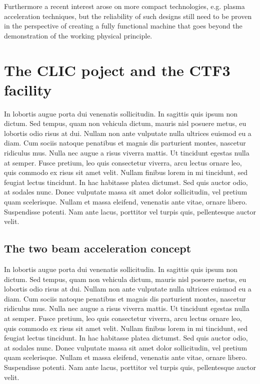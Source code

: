 Furthermore a recent interest arose on more compact technologies, e.g. plasma acceleration techniques, but the reliability of such designs still need to be proven in the perspective of creating a fully functional machine that goes beyond the demonstration of the working physical principle.

\newpage
\section{The CLIC poject and the CTF3 facility}

In lobortis augue porta dui venenatis sollicitudin. In sagittis quis ipsum non dictum. Sed tempus, quam non vehicula dictum, mauris nisl posuere metus, eu lobortis odio risus at dui. Nullam non ante vulputate nulla ultrices euismod eu a diam. Cum sociis natoque penatibus et magnis dis parturient montes, nascetur ridiculus mus. Nulla nec augue a risus viverra mattis. Ut tincidunt egestas nulla at semper. Fusce pretium, leo quis consectetur viverra, arcu lectus ornare leo, quis commodo ex risus sit amet velit. Nullam finibus lorem in mi tincidunt, sed feugiat lectus tincidunt. In hac habitasse platea dictumst. Sed quis auctor odio, at sodales nunc. Donec vulputate massa sit amet dolor sollicitudin, vel pretium quam scelerisque. Nullam et massa eleifend, venenatis ante vitae, ornare libero. Suspendisse potenti. Nam ante lacus, porttitor vel turpis quis, pellentesque auctor velit.

\subsection{The two beam acceleration concept}

In lobortis augue porta dui venenatis sollicitudin. In sagittis quis ipsum non dictum. Sed tempus, quam non vehicula dictum, mauris nisl posuere metus, eu lobortis odio risus at dui. Nullam non ante vulputate nulla ultrices euismod eu a diam. Cum sociis natoque penatibus et magnis dis parturient montes, nascetur ridiculus mus. Nulla nec augue a risus viverra mattis. Ut tincidunt egestas nulla at semper. Fusce pretium, leo quis consectetur viverra, arcu lectus ornare leo, quis commodo ex risus sit amet velit. Nullam finibus lorem in mi tincidunt, sed feugiat lectus tincidunt. In hac habitasse platea dictumst. Sed quis auctor odio, at sodales nunc. Donec vulputate massa sit amet dolor sollicitudin, vel pretium quam scelerisque. Nullam et massa eleifend, venenatis ante vitae, ornare libero. Suspendisse potenti. Nam ante lacus, porttitor vel turpis quis, pellentesque auctor velit.

